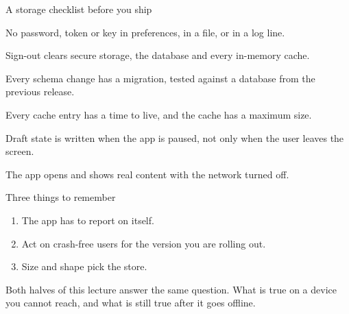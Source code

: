 \documentclass[10pt,aspectratio=169,t]{beamer}
\begin{document}
\begin{frame}[eyebrow=Lifecycle]{A storage checklist before you ship}
  \vskip 2mm
  \begin{checklist}
    \item No password, token or key in preferences, in a file, or in a log line.
    \item Sign-out clears secure storage, the database and every in-memory cache.
    \item Every schema change has a migration, tested against a database from the previous release.
    \item Every cache entry has a time to live, and the cache has a maximum size.
    \item Draft state is written when the app is paused, not only when the user leaves the screen.
    \item The app opens and shows real content with the network turned off.
  \end{checklist}
  \vskip 2mm
\end{frame}

\begin{frame}[eyebrow=Recap]{Three things to remember}
  \vskip 2mm
  \begin{enumerate}
    \item The app has to report on itself. 
    \item Act on crash-free users for the version you are rolling out. 
    \item Size and shape pick the store. 
  \end{enumerate}
  \begin{takeaway}{Both halves of this lecture answer the same question.}
    What is true on a device you cannot reach, and what is still true after it goes offline.
  \end{takeaway}
\end{frame}
\end{document}
